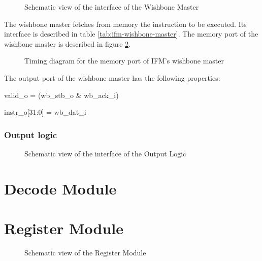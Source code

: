 \begin{figure}[H]
    \centering
    
    \caption{Schematic view of the interface of the Wishbone Master}
    \label{fig:ifm-wishbone-master}
\end{figure}

\begin{content}
  The wishbone master fetches from memory the instruction to be executed. Its interface is described in table \ref{tab:ifm-wishbone-master}.
  The memory port of the wishbone master is described in figure \ref{fig:ifm-wishbone-read}. 
\end{content}



\begin{figure}[H]
  \centering
  
  \caption{Timing diagram for the memory port of IFM's wishbone master}
  \label{fig:ifm-wishbone-read}
\end{figure}

\begin{content}
  The output port of the wishbone master has the following properties:
  \begin{center}
    valid\_o = (wb\_stb\_o \& wb\_ack\_i)

    instr\_o[31:0] = wb\_dat\_i
  \end{center}
\end{content}

\subsubsection{Output logic}

\begin{figure}[H]
    \centering
    
    \caption{Schematic view of the interface of the Output Logic}
    \label{fig:ifm-output-logic}
\end{figure}

\newpage
\section{Decode Module}
\newpage

\section{Register Module}

\begin{figure}[h!]
    \centering
    
    \caption{Schematic view of the Register Module}
    \label{fig:regm}
\end{figure}

